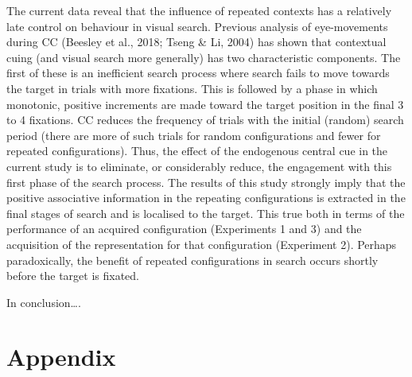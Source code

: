 \documentclass[
  man,floatsintext]{apa7}
\begin{document}
The current data reveal that the influence of repeated contexts has a relatively late control on behaviour in visual search. Previous analysis of eye-movements during CC (Beesley et al., 2018; Tseng \& Li, 2004) has shown that contextual cuing (and visual search more generally) has two characteristic components. The first of these is an inefficient search process where search fails to move towards the target in trials with more fixations. This is followed by a phase in which monotonic, positive increments are made toward the target position in the final 3 to 4 fixations. CC reduces the frequency of trials with the initial (random) search period (there are more of such trials for random configurations and fewer for repeated configurations). Thus, the effect of the endogenous central cue in the current study is to eliminate, or considerably reduce, the engagement with this first phase of the search process. The results of this study strongly imply that the positive associative information in the repeating configurations is extracted in the final stages of search and is localised to the target. This true both in terms of the performance of an acquired configuration (Experiments 1 and 3) and the acquisition of the representation for that configuration (Experiment 2). Perhaps paradoxically, the benefit of repeated configurations in search occurs shortly before the target is fixated.

In conclusion\ldots.

\newpage

\hypertarget{appendix}{%
\section{Appendix}\label{appendix}}
\end{document}
